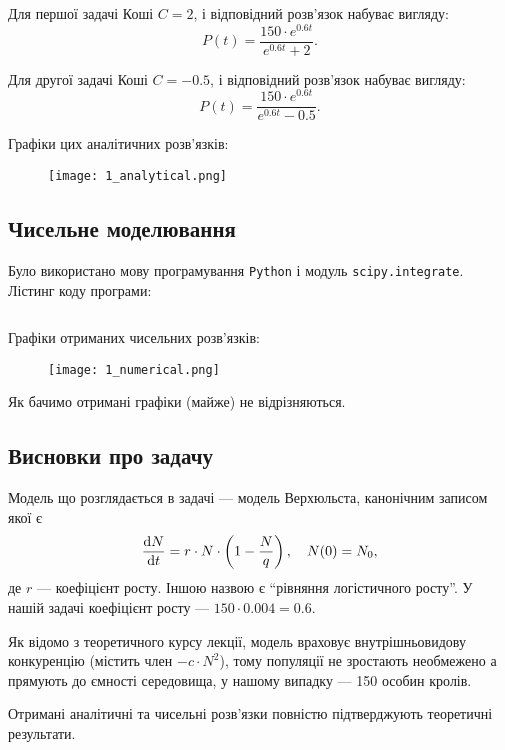 Для першої задачі Коші $C = 2$, і відповідний розв'язок набуває вигляду:
\begin{equation*}
	P(t) = \frac{150 \cdot e^{0.6 t}}{e^{0.6 t} + 2}.
\end{equation*}

Для другої задачі Коші $C = - 0.5$, і відповідний розв'язок набуває вигляду:
\begin{equation*}
	P(t) = \frac{150 \cdot e^{0.6 t}}{e^{0.6 t} - 0.5}.
\end{equation*}

Графіки цих аналітичних розв'язків:
\begin{figure}[H]
	\centering
	\texttt{[image: 1\_analytical.png]}
\end{figure}

\subsection{Чисельне моделювання}

Було використано мову програмування \texttt{Python} і модуль \texttt{scipy.integrate}. Лістинг коду програми:
\inputminted{python}{../py/1_numerical.py}

Графіки отриманих чисельних розв'язків:
\begin{figure}[H]
	\centering
	\texttt{[image: 1\_numerical.png]}
\end{figure}

Як бачимо отримані графіки (майже) не відрізняються.

\subsection{Висновки про задачу}

Модель що розглядається в задачі --- модель Верхюльста, канонічним записом якої є 
\begin{equation*}
    \frac{\mathop{}\!\mathrm{d} N}{\mathop{}\!\mathrm{d} t} = r \cdot N \cdot \left( 1 - \frac{N}{q} \right), \quad N(0) = N_0,
\end{equation*}
де $r$ --- коефіцієнт росту. Іншою назвою є ``рівняння логістичного росту''. У нашій задачі коефіцієнт росту --- $150 \cdot 0.004 = 0.6$. \medskip

Як відомо з теоретичного курсу лекції, модель враховує внутрішньовидову конкуренцію (містить член $-c \cdot N^2$), тому популяції не зростають необмежено а прямують до ємності середовища, у нашому випадку --- 150 особин кролів. \medskip

Отримані аналітичні та чисельні розв'язки повністю підтверджують теоретичні результати.

